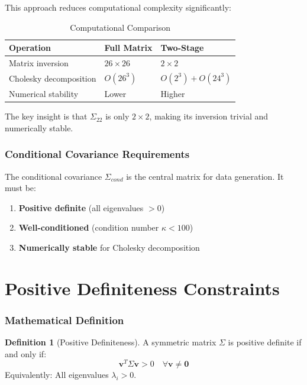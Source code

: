 \documentclass[11pt]{article}
\theoremstyle{definition}
\newtheorem{definition}{Definition}
\begin{document}
This approach reduces computational complexity significantly:

\begin{table}[h]
\centering
\caption{Computational Comparison}
\begin{tabular}{@{}lll@{}}
\toprule
\textbf{Operation} & \textbf{Full Matrix} & \textbf{Two-Stage} \\
\midrule
Matrix inversion & $26 \times 26$ & $2 \times 2$ \\
Cholesky decomposition & $O(26^3)$ & $O(2^3) + O(24^3)$ \\
Numerical stability & Lower & Higher \\
\bottomrule
\end{tabular}
\end{table}

The key insight is that $\Sigma_{22}$ is only $2 \times 2$, making its
inversion trivial and numerically stable.

\section{Conditional Covariance Requirements}

The conditional covariance $\Sigma_{cond}$ is the central matrix for data
generation. It must be:
\begin{enumerate}
    \item \textbf{Positive definite} (all eigenvalues $> 0$)
    \item \textbf{Well-conditioned} (condition number $\kappa < 100$)
    \item \textbf{Numerically stable} for Cholesky decomposition
\end{enumerate}

\part{Positive Definiteness Constraints}

\section{Mathematical Definition}

\begin{definition}[Positive Definiteness]
A symmetric matrix $\Sigma$ is positive definite if and only if:
\begin{equation}
\mathbf{v}^T \Sigma \mathbf{v} > 0 \quad \forall \mathbf{v} \neq \mathbf{0}
\end{equation}
Equivalently: All eigenvalues $\lambda_i > 0$.
\end{definition}
\end{document}

